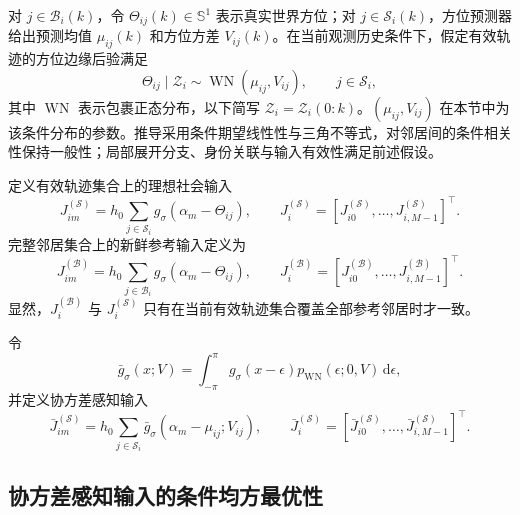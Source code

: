 \documentclass[UTF8,fontset=windows,11pt]{ctexart}
\newcommand{\Sone}{\mathbb S^1}
\begin{document}
对 $j\in\mathcal B_i(k)$，令 $\Theta_{ij}(k)\in\Sone$ 表示真实世界方位；对 $j\in\mathcal S_i(k)$，方位预测器给出预测均值 $\mu_{ij}(k)$ 和方位方差 $V_{ij}(k)$。在当前观测历史条件下，假定有效轨迹的方位边缘后验满足
\begin{equation}
 \Theta_{ij}\mid\mathcal Z_i\sim\operatorname{WN}(\mu_{ij},V_{ij}),
 \qquad j\in\mathcal S_i,
 \label{eq:v2_wn_assumption}
\end{equation}
其中 $\operatorname{WN}$ 表示包裹正态分布，以下简写 $\mathcal Z_i=\mathcal Z_i(0:k)$。$(\mu_{ij},V_{ij})$ 在本节中为该条件分布的参数。推导采用条件期望线性性与三角不等式，对邻居间的条件相关性保持一般性；局部展开分支、身份关联与输入有效性满足前述假设。

定义有效轨迹集合上的理想社会输入
\begin{equation}
 J_{im}^{(\mathcal S)}=h_0\sum_{j\in\mathcal S_i}g_\sigma(\alpha_m-\Theta_{ij}),
 \qquad
 J_i^{(\mathcal S)}=[J_{i0}^{(\mathcal S)},\ldots,J_{i,M-1}^{(\mathcal S)}]^{\top}.
 \label{eq:v2_tracked_ideal}
\end{equation}
完整邻居集合上的新鲜参考输入定义为
\begin{equation}
 J_{im}^{(\mathcal B)}=h_0\sum_{j\in\mathcal B_i}g_\sigma(\alpha_m-\Theta_{ij}),
 \qquad
 J_i^{(\mathcal B)}=[J_{i0}^{(\mathcal B)},\ldots,J_{i,M-1}^{(\mathcal B)}]^{\top}.
 \label{eq:v2_full_ideal}
\end{equation}
显然，$J_i^{(\mathcal B)}$ 与 $J_i^{(\mathcal S)}$ 只有在当前有效轨迹集合覆盖全部参考邻居时才一致。

令
\begin{equation}
 \bar g_\sigma(x;V)=\int_{-\pi}^{\pi}g_\sigma(x-\epsilon)
 p_{\operatorname{WN}}(\epsilon;0,V)\,\mathrm d\epsilon,
 \label{eq:v2_conv_kernel}
\end{equation}
并定义协方差感知输入
\begin{equation}
 \bar J_{im}^{(\mathcal S)}=h_0\sum_{j\in\mathcal S_i}
 \bar g_\sigma(\alpha_m-\mu_{ij};V_{ij}),
 \qquad
 \bar J_i^{(\mathcal S)}=[\bar J_{i0}^{(\mathcal S)},\ldots,\bar J_{i,M-1}^{(\mathcal S)}]^{\top}.
 \label{eq:v2_unc_input}
\end{equation}

\subsection{协方差感知输入的条件均方最优性}
\end{document}
